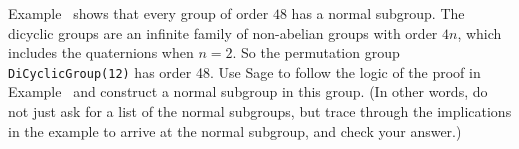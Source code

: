 %
\begin{sageverbatim}\end{sageverbatim}
%
%
Example~ shows that every group of order $48$ has a normal subgroup.  The dicyclic groups are an infinite family of non-abelian groups with order $4n$, which includes the quaternions when $n=2$.  So the permutation group \verb?DiCyclicGroup(12)? has order 48.  Use Sage to follow the logic of the proof in Example~ and construct a normal subgroup in this group.  (In other words, do not just ask for a list of the normal subgroups, but trace through the implications in the example to arrive at the normal subgroup, and check your answer.)
\begin{sageverbatim}\end{sageverbatim}
%

